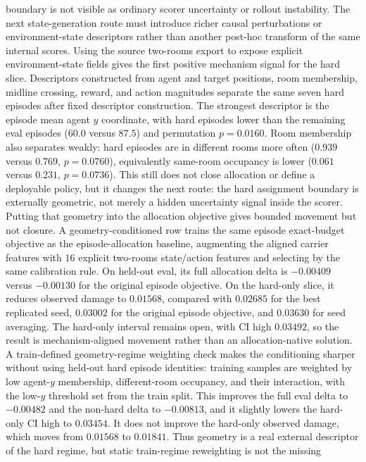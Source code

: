 boundary is not visible as ordinary scorer uncertainty or rollout instability.
The next state-generation route must introduce richer causal perturbations or
environment-state descriptors rather than another post-hoc transform of the
same internal scores.
Using the source two-rooms export to expose explicit environment-state fields
gives the first positive mechanism signal for the hard slice.  Descriptors
constructed from agent and target positions, room membership, midline crossing,
reward, and action magnitudes separate the same seven hard episodes after
fixed descriptor construction.  The strongest descriptor is the episode mean
agent $y$ coordinate, with hard episodes lower than the remaining eval episodes
($60.0$ versus $87.5$) and permutation $p=0.0160$.  Room membership also
separates weakly: hard episodes are in different rooms more often ($0.939$
versus $0.769$, $p=0.0760$), equivalently same-room occupancy is lower
($0.061$ versus $0.231$, $p=0.0736$).  This still does not close allocation
or define a deployable policy, but it changes the next route: the hard
assignment boundary is externally geometric, not merely a hidden uncertainty
signal inside the scorer.
Putting that geometry into the allocation objective gives bounded movement but
not closure.  A geometry-conditioned row trains the same episode exact-budget
objective as the episode-allocation baseline, augmenting the aligned carrier
features with $16$ explicit two-rooms state/action features and selecting by
the same calibration rule.  On held-out eval, its full allocation delta is
$-0.00409$ versus $-0.00130$ for the original episode objective.  On the
hard-only slice, it reduces observed damage to $0.01568$, compared with
$0.02685$ for the best replicated seed, $0.03002$ for the original episode
objective, and $0.03630$ for seed averaging.  The hard-only interval remains
open, with CI high $0.03492$, so the result is mechanism-aligned movement
rather than an allocation-native solution.  A train-defined geometry-regime
weighting check makes the conditioning sharper without using held-out hard
episode identities: training samples are weighted by low agent-$y$ membership,
different-room occupancy, and their interaction, with the low-$y$ threshold
set from the train split.  This improves the full eval delta to $-0.00482$ and
the non-hard delta to $-0.00813$, and it slightly lowers the hard-only CI high
to $0.03454$.  It does not improve the hard-only observed damage, which moves
from $0.01568$ to $0.01841$.  Thus geometry is a real external descriptor of
the hard regime, but static train-regime reweighting is not the missing
